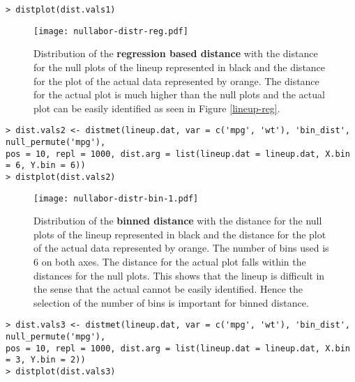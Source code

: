 \newpage

\begin{verbatim}
> distplot(dist.vals1)
\end{verbatim}

\begin{figure*}[hbtp]
\begin{center}
\texttt{[image: nullabor-distr-reg.pdf]}
\caption{Distribution of the \textbf{regression based distance} with the distance for the null plots of the lineup represented in black and the distance for the plot of the actual data represented by orange. The distance for the actual plot is much higher than the null plots and the actual plot can be easily identified as seen in Figure \ref{lineup-reg}. }
\label{dist-reg}
\end{center}
\end{figure*}

\newpage

\begin{verbatim}
> dist.vals2 <- distmet(lineup.dat, var = c('mpg', 'wt'), 'bin_dist', null_permute('mpg'), 
pos = 10, repl = 1000, dist.arg = list(lineup.dat = lineup.dat, X.bin = 6, Y.bin = 6))
> distplot(dist.vals2)
\end{verbatim}

\begin{figure*}[hbtp]
\begin{center}
\texttt{[image: nullabor-distr-bin-1.pdf]}
\caption{Distribution of the \textbf{binned distance} with the distance for the null plots of the lineup represented in black and the distance for the plot of the actual data represented by orange. The number of bins used is 6 on both axes. The distance for the actual plot falls within the distances for the null plots. This shows that the lineup is difficult in the sense that the actual cannot be easily identified.  Hence the selection of the number of bins is important for binned distance. }
\label{dist-bin-1}
\end{center}
\end{figure*}

\newpage

\begin{verbatim}
> dist.vals3 <- distmet(lineup.dat, var = c('mpg', 'wt'), 'bin_dist', null_permute('mpg'), 
pos = 10, repl = 1000, dist.arg = list(lineup.dat = lineup.dat, X.bin = 3, Y.bin = 2))
> distplot(dist.vals3)
\end{verbatim}

